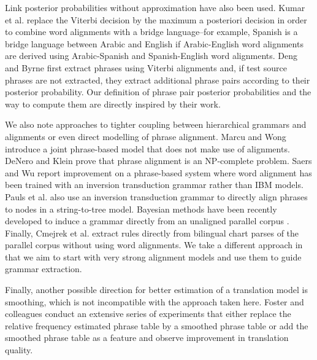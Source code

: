  Link posterior probabilities without approximation have also been used. Kumar et al.  replace 
  the Viterbi
  decision by the maximum a posteriori decision in order to combine word alignments with a bridge language--for example, Spanish is a bridge
  language between Arabic and English if Arabic-English word alignments are derived using Arabic-Spanish and
  Spanish-English word alignments. Deng and Byrne 
  first extract phrases using Viterbi alignments and, if test source phrases are not extracted, they extract additional phrase pairs
  according to their posterior probability. Our definition of phrase pair posterior probabilities and the way
  to compute them are directly
  inspired by their work.

  We also note approaches to tighter coupling between
  hierarchical grammars and alignments or even direct modelling of 
  phrase alignment. Marcu and Wong  introduce a joint phrase-based model
  that does not make use of alignments. DeNero and Klein  prove
  that phrase alignment is an NP-complete problem. Saers
  and Wu  report improvement on a phrase-based
  system where word alignment has been trained with
  an inversion transduction grammar rather than
  IBM models. Pauls et al.  also use an inversion transduction grammar
  to directly align phrases to nodes in a string-to-tree
  model. Bayesian methods have been recently developed
  to induce a grammar directly from an unaligned
  parallel corpus \cite{blunsom-cohn-osborne:2008:NIPS,blunsom-cohn-dyer-osborne:2009:ACL}.
  Finally, Cmejrek et al. 
  extract rules directly from bilingual chart parses of
  the parallel corpus without using word alignments.
  We take a different approach in that we aim to start
  with very strong alignment models and use them to
  guide grammar extraction.

  Finally, another possible direction for better estimation of a translation model
  is smoothing, which is not incompatible with the approach taken here. Foster and
  colleagues \cite{foster-kuhn-johnson:2006:EMNLP} conduct an extensive series of
  experiments that either replace the relative frequency estimated phrase table by
  a smoothed phrase table or add the smoothed phrase table as a feature and
  observe improvement in translation quality.
